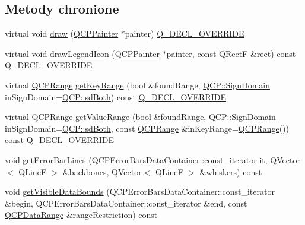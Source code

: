 \subsection*{Metody chronione}
\begin{DoxyCompactItemize}
\item 
virtual void \hyperlink{class_q_c_p_error_bars_a801e85931372abf2a1034bfb2eac5cd2}{draw} (\hyperlink{class_q_c_p_painter}{Q\+C\+P\+Painter} $\ast$painter) \hyperlink{qcustomplot_8hh_a42cc5eaeb25b85f8b52d2a4b94c56f55}{Q\+\_\+\+D\+E\+C\+L\+\_\+\+O\+V\+E\+R\+R\+I\+DE}
\item 
virtual void \hyperlink{class_q_c_p_error_bars_a20f5d292e66103f26bca00b11ce417b4}{draw\+Legend\+Icon} (\hyperlink{class_q_c_p_painter}{Q\+C\+P\+Painter} $\ast$painter, const Q\+RectF \&rect) const \hyperlink{qcustomplot_8hh_a42cc5eaeb25b85f8b52d2a4b94c56f55}{Q\+\_\+\+D\+E\+C\+L\+\_\+\+O\+V\+E\+R\+R\+I\+DE}
\item 
virtual \hyperlink{class_q_c_p_range}{Q\+C\+P\+Range} \hyperlink{class_q_c_p_error_bars_a6cac828a430d66ac77a167549d01d212}{get\+Key\+Range} (bool \&found\+Range, \hyperlink{namespace_q_c_p_afd50e7cf431af385614987d8553ff8a9}{Q\+C\+P\+::\+Sign\+Domain} in\+Sign\+Domain=\hyperlink{namespace_q_c_p_afd50e7cf431af385614987d8553ff8a9aa38352ef02d51ddfa4399d9551566e24}{Q\+C\+P\+::sd\+Both}) const \hyperlink{qcustomplot_8hh_a42cc5eaeb25b85f8b52d2a4b94c56f55}{Q\+\_\+\+D\+E\+C\+L\+\_\+\+O\+V\+E\+R\+R\+I\+DE}
\item 
virtual \hyperlink{class_q_c_p_range}{Q\+C\+P\+Range} \hyperlink{class_q_c_p_error_bars_ab76215a186ae4862235821e028685f26}{get\+Value\+Range} (bool \&found\+Range, \hyperlink{namespace_q_c_p_afd50e7cf431af385614987d8553ff8a9}{Q\+C\+P\+::\+Sign\+Domain} in\+Sign\+Domain=\hyperlink{namespace_q_c_p_afd50e7cf431af385614987d8553ff8a9aa38352ef02d51ddfa4399d9551566e24}{Q\+C\+P\+::sd\+Both}, const \hyperlink{class_q_c_p_range}{Q\+C\+P\+Range} \&in\+Key\+Range=\hyperlink{class_q_c_p_range}{Q\+C\+P\+Range}()) const \hyperlink{qcustomplot_8hh_a42cc5eaeb25b85f8b52d2a4b94c56f55}{Q\+\_\+\+D\+E\+C\+L\+\_\+\+O\+V\+E\+R\+R\+I\+DE}
\item 
void \hyperlink{class_q_c_p_error_bars_afafbd781f0e702a773524d7ee9220741}{get\+Error\+Bar\+Lines} (Q\+C\+P\+Error\+Bars\+Data\+Container\+::const\+\_\+iterator it, Q\+Vector$<$ Q\+LineF $>$ \&backbones, Q\+Vector$<$ Q\+LineF $>$ \&whiskers) const 
\item 
void \hyperlink{class_q_c_p_error_bars_a4d86d520222be51851106312dff75c49}{get\+Visible\+Data\+Bounds} (Q\+C\+P\+Error\+Bars\+Data\+Container\+::const\+\_\+iterator \&begin, Q\+C\+P\+Error\+Bars\+Data\+Container\+::const\+\_\+iterator \&end, const \hyperlink{class_q_c_p_data_range}{Q\+C\+P\+Data\+Range} \&range\+Restriction) const 

\end{DoxyCompactItemize}
